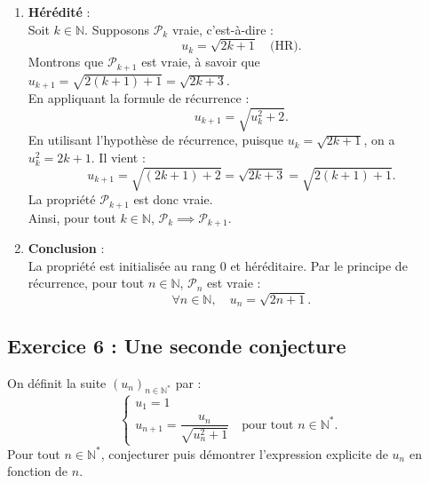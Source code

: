 \documentclass[11pt,a4paper]{article}
\newcommand{\N}{\mathbb{N}}
\begin{document}
\begin{correctionbox}
\begin{enumerate}[label=\textbf{\arabic*.}]
    \item \textbf{Hérédité} :\\
    Soit $k \in \N$. Supposons $\mathcal{P}_k$ vraie, c'est-à-dire :
    \[
    u_k = \sqrt{2k+1} \quad \text{(HR)}.
    \]
    Montrons que $\mathcal{P}_{k+1}$ est vraie, à savoir que $u_{k+1} = \sqrt{2(k+1)+1} = \sqrt{2k+3}$.\\
    En appliquant la formule de récurrence :
    \[
    u_{k+1} = \sqrt{u_k^2 + 2}.
    \]
    En utilisant l'hypothèse de récurrence, puisque $u_k = \sqrt{2k+1}$, on a $u_k^2 = 2k+1$. Il vient :
    \[
    u_{k+1} = \sqrt{(2k+1) + 2} = \sqrt{2k+3} = \sqrt{2(k+1) + 1}.
    \]
    La propriété $\mathcal{P}_{k+1}$ est donc vraie.\\
    Ainsi, pour tout $k \in \N$, $\mathcal{P}_k \implies \mathcal{P}_{k+1}$.

    \item \textbf{Conclusion} :\\
    La propriété est initialisée au rang $0$ et héréditaire. Par le principe de récurrence, pour tout $n \in \N$, $\mathcal{P}_n$ est vraie :
    \[
    \forall n \in \N, \quad u_n = \sqrt{2n+1}.
    \]
\end{enumerate}
\end{correctionbox}

\subsection*{Exercice 6 : Une seconde conjecture}

On définit la suite $(u_n)_{n \in \N^*}$ par :
\[
\begin{cases}
u_1 = 1 \\
u_{n+1} = \dfrac{u_n}{\sqrt{u_n^2 + 1}} \quad \text{pour tout } n \in \N^*.
\end{cases}
\]
Pour tout $n \in \N^*$, conjecturer puis démontrer l'expression explicite de $u_n$ en fonction de $n$.
\end{document}
